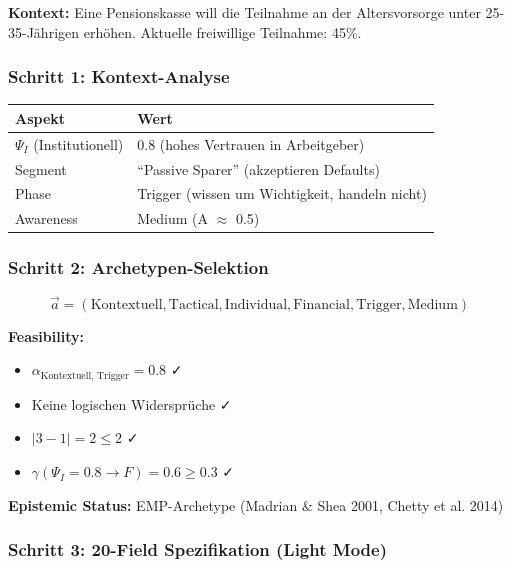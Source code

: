 \textbf{Kontext:} Eine Pensionskasse will die Teilnahme an der Altersvorsorge unter 25-35-Jährigen erhöhen. Aktuelle freiwillige Teilnahme: 45\%.

\subsubsection{Schritt 1: Kontext-Analyse}

\begin{center}
\begin{tabular}{@{}ll@{}}
\toprule
\textbf{Aspekt} & \textbf{Wert} \\
\midrule
$\Psi_I$ (Institutionell) & 0.8 (hohes Vertrauen in Arbeitgeber) \\
Segment & ``Passive Sparer'' (akzeptieren Defaults) \\
Phase & Trigger (wissen um Wichtigkeit, handeln nicht) \\
Awareness & Medium (A $\approx$ 0.5) \\
\bottomrule
\end{tabular}
\end{center}

\subsubsection{Schritt 2: Archetypen-Selektion}

\begin{equation}
\vec{a} = (\text{Kontextuell}, \text{Tactical}, \text{Individual}, \text{Financial}, \text{Trigger}, \text{Medium})
\end{equation}

\textbf{Feasibility:}
\begin{itemize}[nosep]
\item $\alpha_{\text{Kontextuell, Trigger}} = 0.8$ ✓
\item Keine logischen Widersprüche ✓
\item $|3 - 1| = 2 \leq 2$ ✓
\item $\gamma(\Psi_I = 0.8 \rightarrow F) = 0.6 \geq 0.3$ ✓
\end{itemize}

\textbf{Epistemic Status:} EMP-Archetype (Madrian \& Shea 2001, Chetty et al. 2014)

\subsubsection{Schritt 3: 20-Field Spezifikation (Light Mode)}

